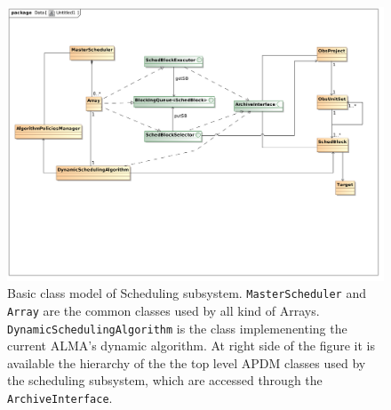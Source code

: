 \documentclass[11pt]{article}
\begin{document}
\begin{figure}	
\centering
\includegraphics[width=\textwidth]{images/scheduling_class_model}
\caption{Basic class model of Scheduling subsystem. \texttt{MasterScheduler} and \texttt{Array} are the common classes used by all kind of Arrays. \texttt{DynamicSchedulingAlgorithm} is the class implemenenting the current ALMA's dynamic algorithm. At right side of the figure it is available the hierarchy of the the top level APDM classes used by the scheduling subsystem, which are accessed through the \texttt{ArchiveInterface}. } 
\label{fig:sched-class-model}
\end{figure}
\end{document}

